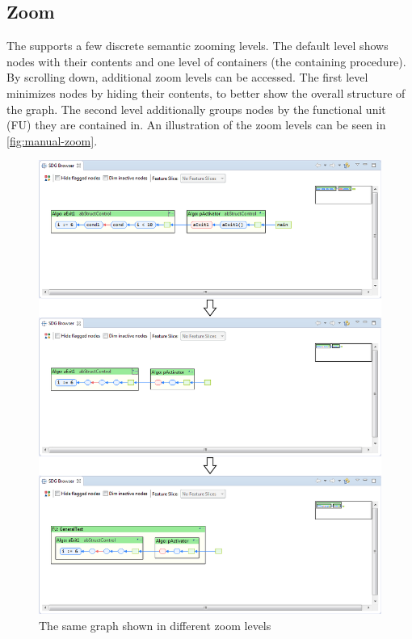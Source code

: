 \subsection{Zoom}

The \SB supports a few discrete semantic zooming levels. The default level shows nodes with their contents and one 
level of containers (the containing procedure). By scrolling down, additional zoom levels can be accessed. The first 
level minimizes nodes by hiding their contents, to better show the overall structure of the graph. The second level 
additionally groups nodes by the functional unit (FU) they are contained in. An illustration of the zoom levels can be 
seen in \autoref{fig:manual-zoom}.

\begin{figure}[p]
  \centering
    \includegraphics[width=\textwidth]{bilder/manual-zoom}
  \caption{The same graph shown in different zoom levels}
  \label{fig:manual-zoom}
\end{figure}


